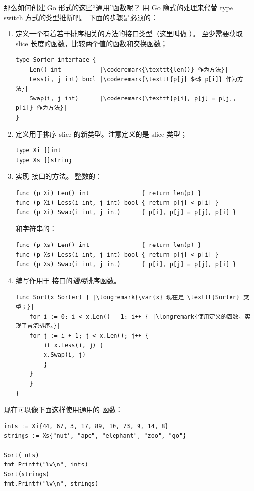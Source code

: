 那么如何创建 Go 形式的这些``通用''函数呢？
用 Go 隐式的处理来代替 type switch 方式的类型推断吧。
下面的步骤是必须的：
\begin{enumerate}
\item 定义一个有着若干排序相关的方法的接口类型（这里叫做 ）。
至少需要获取 slice 长度的函数，比较两个值的函数和交换函数；
\begin{lstlisting}
type Sorter interface {
    Len() int           |\coderemark{\texttt{len()} 作为方法}|
    Less(i, j int) bool |\coderemark{\texttt{p[j] $<$ p[i]} 作为方法}|
    Swap(i, j int)      |\coderemark{\texttt{p[i], p[j] = p[j], p[i]} 作为方法}|
}
\end{lstlisting}
\item 定义用于排序 slice 的新类型。注意定义的是 slice 类型；
\begin{lstlisting}
type Xi []int
type Xs []string
\end{lstlisting}
\item 实现  接口的方法。
整数的：
\begin{lstlisting}
func (p Xi) Len() int               { return len(p) }
func (p Xi) Less(i int, j int) bool { return p[j] < p[i] }
func (p Xi) Swap(i int, j int)      { p[i], p[j] = p[j], p[i] }
\end{lstlisting}
和字符串的：
\begin{lstlisting}
func (p Xs) Len() int               { return len(p) }
func (p Xs) Less(i int, j int) bool { return p[j] < p[i] }
func (p Xs) Swap(i int, j int)      { p[i], p[j] = p[j], p[i] }
\end{lstlisting}
\item 编写作用于  接口的\emph{通用}排序函数。
\begin{lstlisting}
func Sort(x Sorter) { |\longremark{\var{x} 现在是 \texttt{Sorter} 类型；}|
    for i := 0; i < x.Len() - 1; i++ { |\longremark{使用定义的函数，实现了冒泡排序。}|
	for j := i + 1; j < x.Len(); j++ {
	    if x.Less(i, j) {
		x.Swap(i, j)
	    }
	}
    }
}
\end{lstlisting}
\showremarks
\end{enumerate}
现在可以像下面这样使用通用的  函数：
\begin{lstlisting}
ints := Xi{44, 67, 3, 17, 89, 10, 73, 9, 14, 8}
strings := Xs{"nut", "ape", "elephant", "zoo", "go"}

Sort(ints)
fmt.Printf("%v\n", ints)
Sort(strings)
fmt.Printf("%v\n", strings)
\end{lstlisting}

